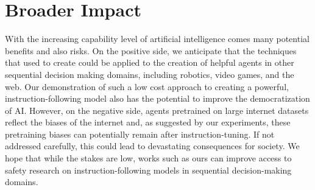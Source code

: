 
\section{Broader Impact}
\label{appdx:broader_impact}

With the increasing capability level of artificial intelligence comes many potential benefits and also risks. On the positive side, we anticipate that the techniques that used to create \agentname{} could be applied to the creation of helpful agents in other sequential decision making domains, including robotics, video games, and the web. Our demonstration of such a low cost approach to creating a powerful, instruction-following model also has the potential to improve the democratization of AI. However, on the negative side, agents pretrained on large internet datasets reflect the biases of the internet and, as suggested by our experiments, these pretraining biases can potentially remain after instruction-tuning. If not addressed carefully, this could lead to devastating consequences for society. We hope that while the stakes are low, works such as ours can improve access to safety research on instruction-following models in sequential decision-making domains.
